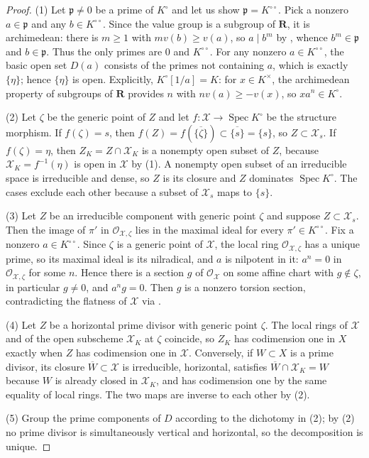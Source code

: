 \begin{proof}
(1) Let $\mathfrak p\ne0$ be a prime of $K^\circ$ and let us show
$\mathfrak p=K^{\circ\circ}$.  Pick a nonzero $a\in\mathfrak p$ and any
$b\in K^{\circ\circ}$.  Since the value group is a subgroup of
$\mathbf R$, it is archimedean: there is $m\geq1$ with
$mv(b)\geq v(a)$, so $a\mid b^m$ by
, whence
$b^m\in\mathfrak p$ and $b\in\mathfrak p$.  Thus the only primes are $0$
and $K^{\circ\circ}$.  For any nonzero $a\in K^{\circ\circ}$, the basic open set
$D(a)$ consists of the primes not containing $a$, which is exactly
$\{\eta\}$; hence $\{\eta\}$ is open.  Explicitly,
$K^\circ[1/a]=K$: for $x\in K^\times$, the archimedean property of
subgroups of $\mathbf R$ provides $n$ with $nv(a)\geq-v(x)$, so
$xa^n\in K^\circ$.

(2) Let $\zeta$ be the generic point of $Z$ and let
$f:\mathcal X\to\operatorname{Spec}K^\circ$ be the structure morphism.
If $f(\zeta)=s$, then
$f(Z)=f(\overline{\{\zeta\}})\subset\overline{\{s\}}=\{s\}$, so
$Z\subset\mathcal X_s$.  If $f(\zeta)=\eta$, then
$Z_K=Z\cap\mathcal X_K$ is a nonempty open subset of $Z$, because
$\mathcal X_K=f^{-1}(\eta)$ is open in $\mathcal X$ by (1).  A nonempty
open subset of an irreducible space is irreducible and dense, so $Z$ is its
closure and $Z$ dominates $\operatorname{Spec}K^\circ$.  The cases exclude
each other because a subset of $\mathcal X_s$ maps to $\{s\}$.

(3) Let $Z$ be an irreducible component with generic point $\zeta$ and
suppose $Z\subset\mathcal X_s$.  Then the image of $\pi'$ in
$\mathcal O_{\mathcal X,\zeta}$ lies in the maximal ideal for every
$\pi'\in K^{\circ\circ}$.  Fix a nonzero $a\in K^{\circ\circ}$.  Since
$\zeta$ is a generic point of $\mathcal X$, the local ring
$\mathcal O_{\mathcal X,\zeta}$ has a unique prime, so its maximal ideal is
its nilradical, and $a$ is nilpotent in it: $a^n=0$ in
$\mathcal O_{\mathcal X,\zeta}$ for some $n$.  Hence there is a section $g$
of $\mathcal O_{\mathcal X}$ on some affine chart with $g\notin\zeta$, in
particular $g\ne0$, and $a^ng=0$.  Then $g$ is a nonzero torsion section,
contradicting the flatness of $\mathcal X$ via
.

(4) Let $Z$ be a horizontal prime divisor with generic point $\zeta$.  The
local rings of $\mathcal X$ and of the open subscheme $\mathcal X_K$ at
$\zeta$ coincide, so $Z_K$ has codimension one in $X$ exactly when $Z$ has
codimension one in $\mathcal X$.  Conversely, if $W\subset X$ is a prime
divisor, its closure $\overline W\subset\mathcal X$ is irreducible,
horizontal, satisfies $\overline W\cap\mathcal X_K=W$ because $W$ is
already closed in $\mathcal X_K$, and has codimension one by the same
equality of local rings.  The two maps are inverse to each other by (2).

(5) Group the prime components of $D$ according to the dichotomy in (2);
by (2) no prime divisor is simultaneously vertical and horizontal, so the
decomposition is unique.
\end{proof}

